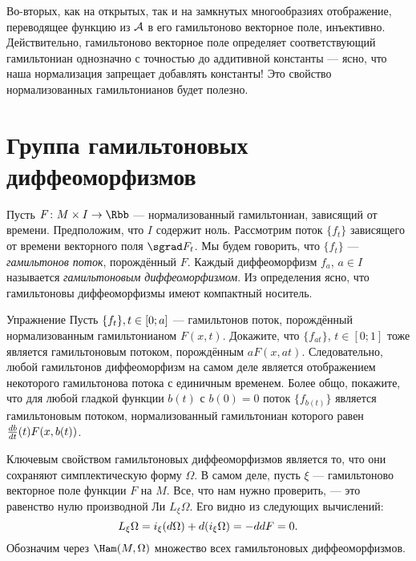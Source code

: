 Во-вторых, как на открытых, так и на замкнутых многообразиях отображение, переводящее функцию из $\mathcal{A}$ в его гамильтоново векторное поле, инъективно.
Действительно, гамильтоново векторное поле определяет соответствующий гамильтониан однозначно с точностью до аддитивной константы — ясно, что наша нормализация запрещает добавлять константы!
Это свойство нормализованных гамильтонианов будет полезно.

\section[Группа гамильтоновых диффеоморфизмов]{Группа гамильтоновых\\диффеоморфизмов}\label{1.4}

Пусть $F\: M \times I \to \Rbb$ — нормализованный гамильтониан, зависящий от времени.
Предположим, что $I$ содержит ноль.
Рассмотрим поток $\{f_t\}$ зависящего от времени векторного поля $\sgrad F_t$.
Мы будем говорить, что $\{f_t\}$ — \emph{гамильтонов поток}, порождённый $F$.
Каждый диффеоморфизм $f_a$, $a \in I$ называется \emph{гамильтоновым диффеоморфизмом}.
Из определения ясно, что гамильтоновы диффеоморфизмы имеют компактный носитель.

\begin{ex}{Упражнение}\label{1.4.A}
Пусть $\{f_t\}, t \z\in [0; a]$ — гамильтонов поток, порождённый нормализованным гамильтонианом $ F (x, t)$.
Докажите, что $\{f_{at}\}$, $t \in [0; 1]$ тоже является гамильтоновым потоком, порождённым $aF (x, at)$.
Следовательно, любой гамильтонов диффеоморфизм на самом деле является отображением некоторого гамильтонова потока с единичным временем.
Более общо, покажите, что для любой гладкой функции $b (t)$ с $b (0) =
0$ поток $\{f_{b (t)}\}$ является гамильтоновым потоком, нормализованный
гамильтониан которого равен $\tfrac{d b}{d t} (t) F (x, b (t))$.
\end{ex}

Ключевым свойством гамильтоновых диффеоморфизмов является то, что они сохраняют симплектическую форму $\Omega$.
В самом деле, пусть $\xi$ — гамильтоново векторное поле функции $F$ на $M$.
Все, что нам нужно проверить, — это равенство нулю производной Ли $L_\xi \Omega$.
Его видно из следующих вычислений: 
\[L_\xi \Omega = i_\xi (d\Omega) + d (i_\xi \Omega) = -dd F = 0.\]
Обозначим через $\Ham (M, \Omega)$ множество всех гамильтоновых диффеоморфизмов.

